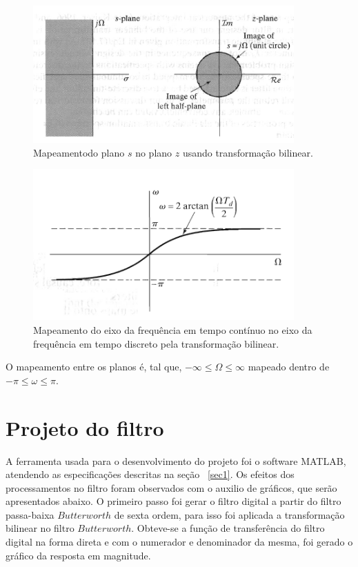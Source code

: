 \documentclass[12pt]{article}
\begin{document}
\begin{figure}[H]
\centering
\includegraphics[width=10cm]{Omega_}
\caption{Mapeamentodo plano $s$ no plano $z$ usando transforma\c c\~ao bilinear.}
\label{map1}
\end{figure}


\begin{figure}[H]
\centering
\begin{center}
\includegraphics[width=10cm]{omega}
\end{center}
\caption{Mapeamento do eixo da frequ\^encia em tempo cont\'inuo no eixo da frequ\^encia em tempo discreto pela transforma\c c\~ao bilinear.}
\label{map2}
\end{figure}

O mapeamento entre os planos \'e, tal que, $-\infty \leq \Omega \leq \infty$ mapeado dentro de  $-\pi \leq \omega \leq \pi$.

\section{Projeto do filtro}
\label{sec4}
A ferramenta usada para o desenvolvimento do projeto foi o software MATLAB, atendendo as especifica\c c\~oes descritas na se\c c\~ao ~\ref{sec1}. Os efeitos dos processamentos no filtro foram observados com o auxilio de gr\'aficos, que ser\~ao apresentados abaixo. O primeiro passo foi gerar o filtro digital a partir do filtro passa-baixa $Butterworth$ de sexta ordem, para isso foi aplicada a transforma\c c\~ao bilinear no filtro $Butterworth$. Obteve-se a fun\c c\~ao de transfer\^encia do filtro digital na forma direta e com o numerador e denominador da mesma, foi gerado o gr\'afico da resposta em magnitude.
\end{document}
